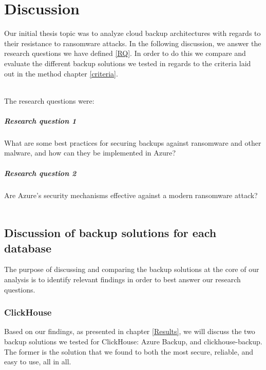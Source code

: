 \chapter{Discussion} \label{Discussion}


Our initial thesis topic was to analyze cloud backup architectures with regards to their resistance to ransomware attacks. In the following discussion, we answer the research questions we have defined \ref{RQ}. In order to do this we compare and evaluate the different backup solutions we tested in regards to the criteria laid out in the method chapter \ref{criteria}.

\\ 
The research questions were: 
\paragraph{Research question 1}
What are some  best practices for securing backups against ransomware and other malware, and how can they be implemented in Azure?
\paragraph{Research question 2}
Are Azure's security mechanisms effective against a modern ransomware attack?
\\ \\

\section{Discussion of backup solutions for each database}
The purpose of discussing and comparing the backup solutions at the core of our analysis is to identify relevant findings in order to best answer our research questions. 

\subsection{ClickHouse}
Based on our findings, as presented in chapter \ref{Results}, we will discuss the two backup solutions we tested for ClickHouse: Azure Backup, and clickhouse-backup. 
The former is the solution that we found to both the most secure, reliable, and easy to use, all in all.  

